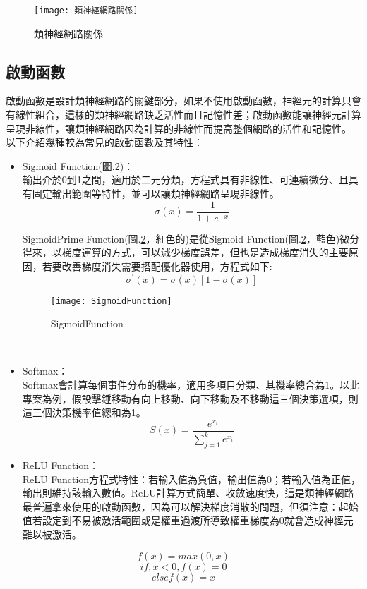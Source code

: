 \newpage
\begin{figure}
\begin{center}
\texttt{[image: 類神經網路關係]}
\caption{\Large 類神經網路關係}
\label{類神經網路關係}
\end{center}
\end{figure}
\subsection{啟動函數}
啟動函數是設計類神經網路的關鍵部分，如果不使用啟動函數，神經元的計算只會有線性組合，這樣的類神經網路缺乏活性而且記憶性差；啟動函數能讓神經元計算呈現非線性，讓類神經網路因為計算的非線性而提高整個網路的活性和記憶性。\\
以下介紹幾種較為常見的啟動函數及其特性：
\begin{itemize}
\item Sigmoid Function(圖.\ref{SigmoidFunction})：\\
輸出介於0到1之間，適用於二元分類，方程式具有非線性、可連續微分、且具有固定輸出範圍等特性，並可以讓類神經網路呈現非線性。
$$\sigma(x)=\frac{1}{1+e^{-x}}$$

SigmoidPrime Function(圖.\ref{SigmoidFunction}，紅色的)是從Sigmoid Function(圖.\ref{SigmoidFunction}，藍色)微分得來，以梯度運算的方式，可以減少梯度誤差，但也是造成梯度消失的主要原因，若要改善梯度消失需要搭配優化器使用，方程式如下:\\
$$\sigma^{'}(x)=\sigma(x)[1-\sigma(x)]$$
\begin{figure}[hbt!]
\begin{center}
\texttt{[image: SigmoidFunction]}
\caption{\Large SigmoidFunction}\label{SigmoidFunction}
\end{center}
\end{figure}
\\
\item Softmax：\\
Softmax會計算每個事件分布的機率，適用多項目分類、其機率總合為1。以此專案為例，假設擊錘移動有向上移動、向下移動及不移動這三個決策選項，則這三個決策機率值總和為1。\\
$$S(x)=\frac{e^{x_i}}{\sum^k_{j=1}e^{x_i}}$$
\item ReLU Function：\\
ReLU Function方程式特性：若輸入值為負值，輸出值為0；若輸入值為正值，輸出則維持該輸入數值。ReLU計算方式簡單、收斂速度快，這是類神經網路最普遍拿來使用的啟動函數，因為可以解決梯度消散的問題，但須注意：起始值若設定到不易被激活範圍或是權重過渡所導致權重梯度為0就會造成神經元難以被激活。\\
\end{itemize}
$$f(x)=max(0,x)$$
$$if , x<0 , f(x)=0$$
$$else f(x)=x$$
